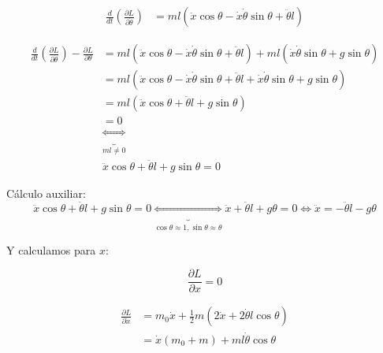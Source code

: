 \documentclass[11pt]{article}
\begin{document}
\begin{align*}
  \frac{d}{dt} (\frac{\partial L}{\partial \dot{\theta}}) &= 
    ml(\ddot{x} \cos \theta - \dot{x} \dot{\theta} \sin \theta  + \ddot{\theta} l)
\end{align*}

\begin{align*}
  \frac{d}{dt} (\frac{\partial L}{\partial \dot{\theta}}) - \frac{\partial L}{\partial \theta} &=
  ml(\ddot{x} \cos \theta - \dot{x} \dot{\theta} \sin \theta  + \ddot{\theta} l)
  + ml( \dot{x} \dot{\theta} \sin \theta + g \sin \theta) \\
  &= ml (\ddot{x} \cos \theta - \dot{x} \dot{\theta} \sin \theta  + \ddot{\theta} l + \dot{x} \dot{\theta} \sin \theta + g \sin \theta) \\
  &= ml (\ddot{x} \cos \theta + \ddot{\theta} l + g \sin \theta) \\
  &= 0 \\
  &\underbrace{\iff}_{ml \neq 0} \\
  &\ddot{x} \cos \theta + \ddot{\theta} l + g \sin \theta = 0
\end{align*}

Cálculo auxiliar:
\begin{equation}
  \label{eq:aux}
  \ddot{x} \cos \theta + \ddot{\theta} l + g \sin \theta = 0
  \underbrace{\iff}_{\cos \theta \approx 1, \sin \theta \approx \theta}
  \ddot{x} + \ddot{\theta} l + g \theta = 0
  \iff \ddot{x} = - \ddot{\theta} l - g \theta
\end{equation}

Y calculamos para $x$:

\begin{equation*}
  \frac{\partial L}{\partial x} = 0
\end{equation*}

\begin{align*}
  \frac{\partial L}{\partial \dot{x}} &= 
    m_0 \dot{x} + \frac{1}{2}m(2\dot{x} + 2\dot{\theta} l \cos \theta) \\
    &= \dot{x} (m_0 + m) + ml\dot{\theta} \cos \theta  
\end{align*}
\end{document}
